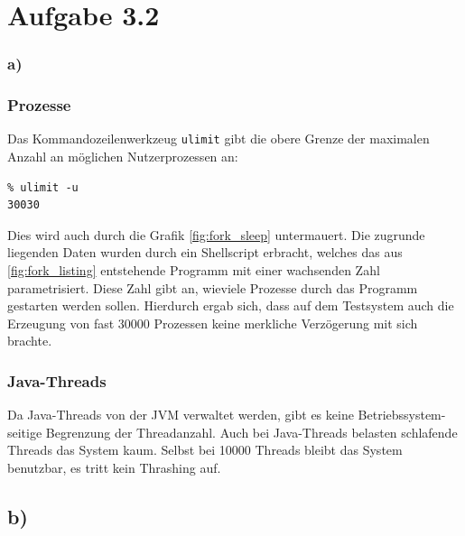 \documentclass[a4paper,
12pt,
BCOR12mm,
]{scrartcl}
\begin{document}
\section{Aufgabe 3.2} 
\subsubsection{a)}
\subsubsection{Prozesse} 
Das Kommandozeilenwerkzeug \verb|ulimit| gibt die obere Grenze der maximalen Anzahl an
möglichen Nutzerprozessen an:
\begin{verbatim} 
% ulimit -u
30030
\end{verbatim}
Dies wird auch durch die Grafik \ref{fig:fork_sleep} untermauert. Die zugrunde liegenden
Daten wurden durch ein Shellscript erbracht, welches das aus \ref{fig:fork_listing}
entstehende Programm mit einer wachsenden Zahl parametrisiert. Diese Zahl gibt an,
wieviele Prozesse durch das Programm gestarten werden sollen. Hierdurch ergab sich, dass
auf dem Testsystem auch die Erzeugung von fast $30000$ Prozessen keine merkliche
Verzögerung mit sich brachte.

\subsubsection{Java-Threads}
Da Java-Threads von der JVM verwaltet werden, gibt es keine Betriebssystem-seitige Begrenzung der Threadanzahl.
Auch bei Java-Threads belasten schlafende Threads das System kaum. Selbst bei 10000 Threads bleibt
das System benutzbar, es tritt kein Thrashing auf.

\subsection{b)}
\end{document}
